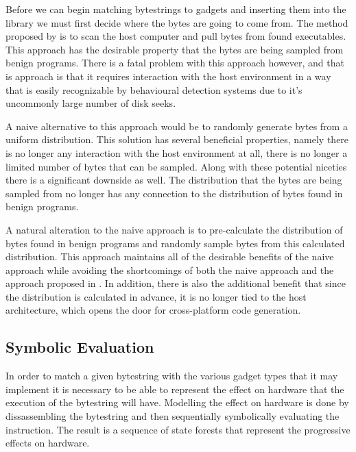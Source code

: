     Before we can begin matching bytestrings to gadgets and inserting them into
    the library we must first decide where the bytes are going to come from.
    The method proposed by \cite{franken} is to scan the host computer and pull
    bytes from found executables. This approach has the desirable property that
    the bytes are being sampled from benign programs. There is a fatal problem
    with this approach however, and that is approach is that it requires
    interaction with the host environment in a way that is easily recognizable
    by behavioural detection systems due to it's uncommonly large number of disk
    seeks.

    A naive alternative to this approach would be to randomly generate bytes
    from a uniform distribution. This solution has several beneficial
    properties, namely there is no longer any interaction with the host
    environment at all, there is no longer a limited number of bytes that can be
    sampled. Along with these potential niceties there is a significant downside
    as well. The distribution that the bytes are being sampled from no longer
    has any connection to the distribution of bytes found in benign programs.

    A natural alteration to the naive approach is to pre-calculate the
    distribution of bytes found in benign programs and randomly sample bytes
    from this calculated distribution. This approach maintains all of the
    desirable benefits of the naive approach while avoiding the shortcomings of
    both the naive approach and the approach proposed in \cite{franken}. In
    addition, there is also the additional benefit that since the distribution
    is calculated in advance, it is no longer tied to the host architecture,
    which opens the door for cross-platform code generation.

    \subsection{Symbolic Evaluation}

    In order to match a given bytestring with the various gadget types that it
    may implement it is necessary to be able to represent the effect on hardware
    that the execution of the bytestring will have. Modelling the effect on
    hardware is done by dissassembling the bytestring and then sequentially
    symbolically evaluating the instruction. The result is a sequence of state
    forests that represent the progressive effects on hardware.

